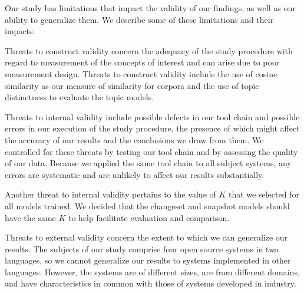 
Our study has limitations that impact the validity of our findings,
as well as our ability to generalize them.
We describe some of these limitations and their impacts.

Threats to construct validity concern the adequacy of the study procedure with regard to
measurement of the concepts of interest and can arise due to poor measurement design.
Threats to construct validity include the use of cosine similarity as our measure of similarity for corpora
and the use of topic distinctness to evaluate the topic models.

Threats to internal validity include possible defects in our tool chain and possible errors
in our execution of the study procedure,
the presence of which might affect the accuracy of our results and the conclusions we draw from them.
We controlled for these threats by testing our tool chain and by assessing the quality of our data.
Because we applied the same tool chain to all subject systems, any errors are systematic and are unlikely
to affect our results substantially.

Another threat to internal validity pertains to the value of $K$ that we selected for all models trained.
We decided that the changeset and snapshot models should have the same $K$
to help facilitate evaluation and comparison.

Threats to external validity concern the extent to which we can generalize our results.
The subjects of our study comprise four open source systems in two languages,
so we cannot generalize our results to systems implemented in other languages.
However, the systems are of different sizes, are from different domains, and
have characteristics in common with those of systems developed in industry.


